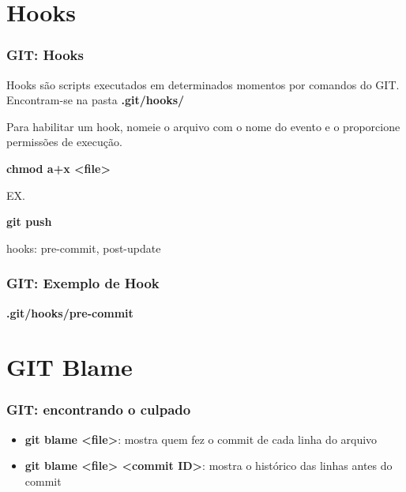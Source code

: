 \documentclass{beamer}
\begin{document}
\section{Hooks}
\begin{frame}
\frametitle{GIT: Hooks}

Hooks são scripts executados em determinados momentos por comandos do GIT. Encontram-se na pasta \textbf{.git/hooks/}

Para habilitar um hook, nomeie o arquivo com o nome do evento e o proporcione permissões de execução.

\textbf{chmod a+x <file>}

EX.

\textbf{git push}

hooks: pre-commit, post-update
\end{frame}

\begin{frame}
\frametitle{GIT: Exemplo de Hook}

\textbf{.git/hooks/pre-commit}

\end{frame}

\section{GIT Blame}
\begin{frame}
\frametitle{GIT: encontrando o culpado}


\begin{itemize}
\item \textbf{git blame <file>}: mostra quem fez o commit de cada linha do arquivo
\item \textbf{git blame <file> <commit ID>}: mostra o histórico das linhas antes do commit
\end{itemize}


\end{frame}
\end{document}
